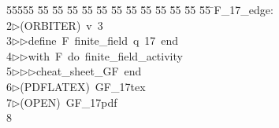 %
%
\begin{tabbing}
55555 \= 55 \= 55 \= 55 \= 55 \= 55 \= 55 \= 55 \= 55 \= 55 \= 55 \= 55 \= 55 \= \>F\_17\_edge:\\[0pt]
2\>$\triangleright$\>(ORBITER)\ v\ 3\ \\[0pt]
3\>$\triangleright$\>$\triangleright$\>define\ F\ finite\_field\ q\ 17\ end\ \\[0pt]
4\>$\triangleright$\>$\triangleright$\>with\ F\ do\ finite\_field\_activity\ \\[0pt]
5\>$\triangleright$\>$\triangleright$\>$\triangleright$\>cheat\_sheet\_GF\ end\\[0pt]
6\>$\triangleright$\>(PDFLATEX)\ GF\_17tex\\[0pt]
7\>$\triangleright$\>(OPEN)\ GF\_17pdf\\[0pt]
8\>\end{tabbing}
